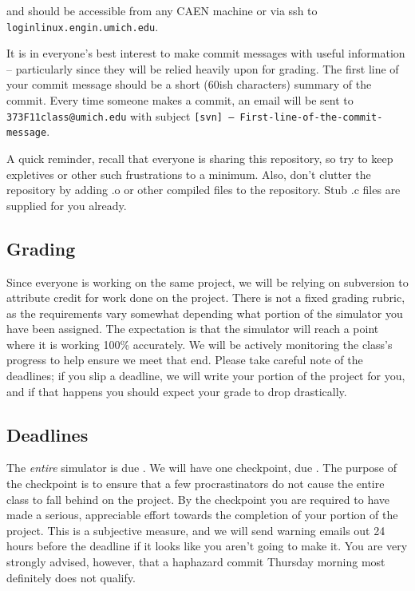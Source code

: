 \documentclass{article}
\begin{document}
and should be accessible
from any CAEN machine or via ssh to {\tt loginlinux.engin.umich.edu}.

It is in everyone's best interest to make commit messages with useful
information -- particularly since they will be relied heavily upon for
grading. The first line of your commit message should be a short (60ish
characters) summary of the commit.
Every time someone makes a commit, an email
will be sent to {\tt 373F11class@umich.edu} with subject {\tt [svn] --
First-line-of-the-commit-message}.

A quick reminder, recall that everyone is sharing this repository, so try to
keep expletives or other such frustrations to a minimum. Also, don't clutter
the repository by adding .o or other compiled files to the repository. Stub .c
files are supplied for you already.

\subsection{Grading}

Since everyone is working on the same project, we will be relying on
subversion to attribute credit for work done on the project. There is not a
fixed grading rubric, as the requirements vary somewhat depending what portion
of the simulator you have been assigned. The expectation is that the simulator
will reach a point where it is working 100\% accurately. We will be actively
monitoring the class's progress to help ensure we meet that end. Please take
careful note of the deadlines; if you slip a deadline, we will write your
portion of the project for you, and if that happens you should expect your
grade to drop drastically.

\subsection{Deadlines}

The {\em entire} simulator is due \duedate. We will have one checkpoint, due
\checkptdate. The purpose of the checkpoint is to ensure that a few
procrastinators do not cause the entire class to fall behind on the project.
By the checkpoint you are required to have made a serious, appreciable effort
towards the completion of your portion of the project. This is a subjective
measure, and we will send warning emails out 24 hours before the deadline if
it looks like you aren't going to make it. You are very strongly advised,
however, that a haphazard commit Thursday morning most definitely does not
qualify.
\end{document}
